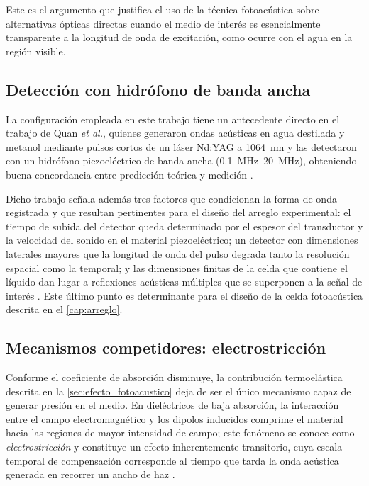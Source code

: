 Este es el argumento que justifica el uso de la técnica
fotoacústica sobre alternativas ópticas directas cuando el medio de
interés es esencialmente transparente a la longitud de onda de
excitación, como ocurre con el agua en la región visible.

\subsection*{Detección con hidrófono de banda ancha}

La configuración empleada en este trabajo tiene un antecedente
directo en el trabajo de Quan \textit{et al.}, quienes generaron
ondas acústicas en agua destilada y metanol mediante pulsos cortos
de un láser Nd:YAG a \SI{1064}{\nano\meter} y las detectaron con un
hidrófono piezoeléctrico de banda ancha (\SIrange{0.1}{20}{\mega\hertz}),
obteniendo buena concordancia entre predicción teórica y medición
\cite{Quan1994}.

Dicho trabajo señala además tres factores que condicionan la forma
de onda registrada y que resultan pertinentes para el diseño del
arreglo experimental: el tiempo de subida del detector queda
determinado por el espesor del transductor y la velocidad del
sonido en el material piezoeléctrico; un detector con dimensiones
laterales mayores que la longitud de onda del pulso degrada tanto
la resolución espacial como la temporal; y las dimensiones finitas
de la celda que contiene el líquido dan lugar a reflexiones
acústicas múltiples que se superponen a la señal de interés
\cite{Quan1994}. Este último punto es determinante para el diseño
de la celda fotoacústica descrita en el \cref{cap:arreglo}.

\subsection*{Mecanismos competidores: electrostricción}

Conforme el coeficiente de absorción disminuye, la contribución
termoelástica descrita en la \cref{sec:efecto_fotoacustico} deja de
ser el único mecanismo capaz de generar presión en el medio. En
dieléctricos de baja absorción, la interacción entre el campo
electromagnético y los dipolos inducidos comprime el material hacia
las regiones de mayor intensidad de campo; este fenómeno se conoce
como \textit{electrostricción} y constituye un efecto inherentemente
transitorio, cuya escala temporal de compensación corresponde al
tiempo que tarda la onda acústica generada en recorrer un ancho de
haz \cite{Astrath2023}.

